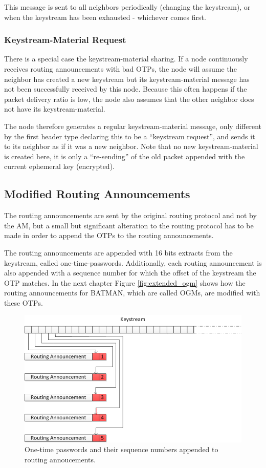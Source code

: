 This message is sent to all neighbors periodically (changing the keystream), or
when the keystream has been exhausted - whichever comes first.

\subsubsection*{Keystream-Material Request}
There is a special case the keystream-material sharing. If a node continuously
receives routing announcements with bad \acp{OTP}, the node will assume the
neighbor has created a new keystream but its keystream-material message has not
been successfully received by this node. Because this often happens if the
packet delivery ratio is low, the node also assumes that the other neighbor does
not have its keystream-material.

The node therefore generates a regular keystream-material message, only
different by the first header type declaring this to be a ``keystream request'',
and sends it to its neighbor as if it was a new neighbor. Note that no new
keystream-material is created here, it is only a ``re-sending'' of the old
packet appended with the current ephemeral key (encrypted).

\subsection{Modified Routing Announcements}
The routing announcements are sent by the original routing protocol and not by
the \ac{AM}, but a small but significant alteration to the routing protocol has
to be made in order to append the \acp{OTP} to the routing announcements.

The routing announcements are appended with 16 bits extracts from the keystream,
called one-time-passwords. Additionally, each routing announcement is also
appended with a sequence number for which the offset of the keystream the
\ac{OTP} matches. In the next chapter Figure \ref{fig:extended_ogm} shows how
the routing announcements for BATMAN, which are called \acp{OGM}, are modified
with these \acp{OTP}.

\begin{figure}[h]
	\centering
  	\includegraphics[width=\textwidth]{images/appending_otp_from_keystream.png}
  	\caption{One-time passwords and their sequence numbers appended to routing annoucements.}
	\label{fig:appending_otp_from_keystream}
\end{figure}

